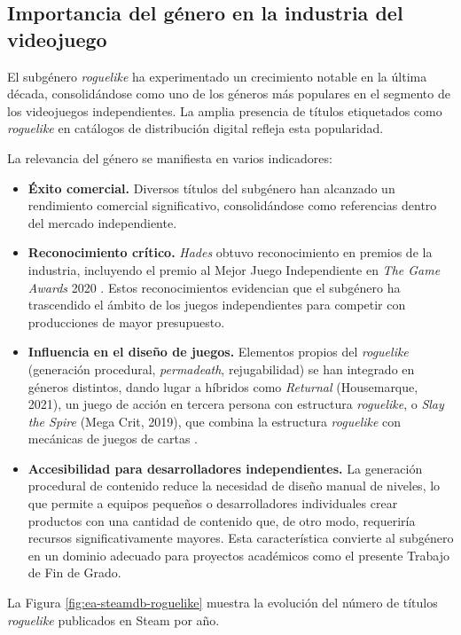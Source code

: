 \subsection{Importancia del género en la industria del videojuego}


El subgénero \textit{roguelike} ha experimentado un crecimiento notable en la última década, consolidándose como uno de los géneros más populares en el segmento de los videojuegos independientes. La amplia presencia de títulos etiquetados como \textit{roguelike} en catálogos de distribución digital refleja esta popularidad.

La relevancia del género se manifiesta en varios indicadores:

\begin{itemize}
\item \textbf{Éxito comercial.} Diversos títulos del subgénero han alcanzado un rendimiento comercial significativo, consolidándose como referencias dentro del mercado independiente.
\item \textbf{Reconocimiento crítico.} \textit{Hades} obtuvo reconocimiento en premios de la industria, incluyendo el premio al Mejor Juego Independiente en \textit{The Game Awards} 2020 \cite{CNET_GAME_AWARDS_2020_WINNERS}. Estos reconocimientos evidencian que el subgénero ha trascendido el ámbito de los juegos independientes para competir con producciones de mayor presupuesto.
\item \textbf{Influencia en el diseño de juegos.} Elementos propios del \textit{roguelike} (generación procedural, \textit{permadeath}, rejugabilidad) se han integrado en géneros distintos, dando lugar a híbridos como \textit{Returnal} (Housemarque, 2021), un juego de acción en tercera persona con estructura \textit{roguelike}, o \textit{Slay the Spire} (Mega Crit, 2019), que combina la estructura \textit{roguelike} con mecánicas de juegos de cartas \cite{STEAM_SLAY_THE_SPIRE_STORE}.
\item \textbf{Accesibilidad para desarrolladores independientes.} La generación procedural de contenido reduce la necesidad de diseño manual de niveles, lo que permite a equipos pequeños o desarrolladores individuales crear productos con una cantidad de contenido que, de otro modo, requeriría recursos significativamente mayores. Esta característica convierte al subgénero en un dominio adecuado para proyectos académicos como el presente Trabajo de Fin de Grado.
\end{itemize}

La Figura \ref{fig:ea-steamdb-roguelike} muestra la evolución del número de títulos \textit{roguelike} publicados en Steam por año.


